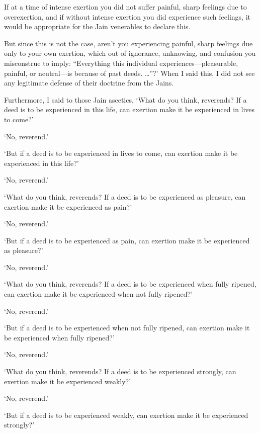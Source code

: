 \documentclass[12pt,openany]{book}%
\begin{document}
If at a time of intense exertion you did not suffer painful, sharp feelings due to overexertion, and if without intense exertion you did experience such feelings, it would be appropriate for the Jain venerables to declare this. 

But since this is not the case, aren’t you experiencing painful, sharp feelings due only to your own exertion, which out of ignorance, unknowing, and confusion you misconstrue to imply: “Everything this individual experiences—pleasurable, painful, or neutral—is because of past deeds. …”?’ When I said this, I did not see any legitimate defense of their doctrine from the Jains. 

Furthermore, I said to those Jain ascetics, ‘What do you think, reverends? If a deed is to be experienced in this life, can exertion make it be experienced in lives to come?’ 

‘No, reverend.’ 

‘But if a deed is to be experienced in lives to come, can exertion make it be experienced in this life?’ 

‘No, reverend.’ 

‘What do you think, reverends? If a deed is to be experienced as pleasure, can exertion make it be experienced as pain?’ 

‘No, reverend.’ 

‘But if a deed is to be experienced as pain, can exertion make it be experienced as pleasure?’ 

‘No, reverend.’ 

‘What do you think, reverends? If a deed is to be experienced when fully ripened, can exertion make it be experienced when not fully ripened?’ 

‘No, reverend.’ 

‘But if a deed is to be experienced when not fully ripened, can exertion make it be experienced when fully ripened?’ 

‘No, reverend.’ 

‘What do you think, reverends? If a deed is to be experienced strongly, can exertion make it be experienced weakly?’ 

‘No, reverend.’ 

‘But if a deed is to be experienced weakly, can exertion make it be experienced strongly?’ 
\end{document}
